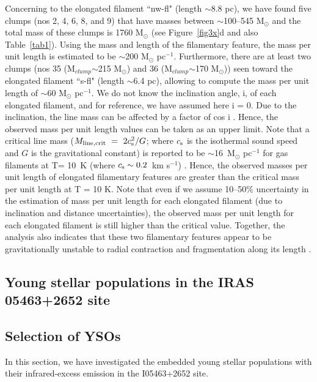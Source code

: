 \documentclass[iop]{emulateapj}
\begin{document}
Concerning to the elongated filament ``nw-fl" (length $\sim$8.8 pc), we have found five clumps (nos 2, 4, 6, 8, and 9) 
that have masses between $\sim$100--545 M$_{\odot}$ and the total mass of these clumps is 1760 M$_{\odot}$ (see Figure~\ref{fig3x}d and also Table~\ref{tab1}). 
Using the mass and length of the filamentary feature, the mass per unit length is estimated to be $\sim$200 M$_{\odot}$ pc$^{-1}$. 
Furthermore, there are at least two clumps (nos 35 (M$_{clump}$$\sim$215 M$_{\odot}$) and 36 (M$_{clump}$$\sim$170 M$_{\odot}$)) 
seen toward the elongated filament ``s-fl" (length $\sim$6.4 pc), 
allowing to compute the mass per unit length of $\sim$60 M$_{\odot}$ pc$^{-1}$. 
We do not know the inclination angle, i, of each elongated filament, and for reference, we have assumed here i = 0.
Due to the inclination, the line mass can be affected by a factor of cos i \citep[e.g.,][]{kainulainen16}. 
Hence, the observed mass per unit length values can be taken as an upper limit. 
Note that a critical line mass ($M_{\rm line,crit}~=~2 c^{2}_{\rm s}/G$; where $c_{\rm s}$ is the isothermal sound speed and $G$ is the gravitational constant) 
is reported to be $\sim$16~M$_{\odot}$ pc$^{-1}$ for gas filaments at T= 10~K 
(where $c_{\rm s} \sim 0.2$~km s$^{-1}$) 
\citep[e.g.,][]{ostriker64,andre14,kainulainen16}. 
Hence, the observed masses per unit length of elongated filamentary features are greater than the critical mass per unit length at T = 10 K. 
Note that even if we assume 10--50\% uncertainty in the estimation of mass per unit length for each elongated filament (due to inclination and distance uncertainties), the observed mass per unit length for each elongated filament is still higher than the critical value.
Together, the analysis also indicates that these two filamentary features appear to be gravitationally unstable to 
radial contraction and fragmentation along its length \citep[e.g.][]{inutsuka97}. 
%
\subsection{Young stellar populations in the IRAS 05463+2652 site}
\label{subsec:phot1}
%
\subsection{Selection of YSOs}
%
In this section, we have investigated the embedded young stellar populations with their infrared-excess emission in the I05463+2652 site.
\end{document}
